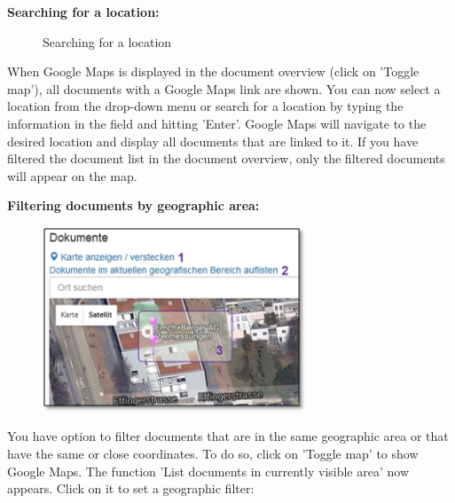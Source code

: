 \textbf{Searching for a location:} 

\begin{figure}[H]
\caption{Searching for a location}
\end{figure}

When Google Maps is displayed in the document overview (click on 'Toggle map'), all documents with a Google Maps link are shown. You can now select a location from the drop-down menu  or search for a location  by typing the information in the field and hitting 'Enter'. Google Maps will navigate to the desired location and display all documents that are linked to it. If you have filtered the document list in the document overview, only the filtered documents will appear on the map. \newline

\textbf{Filtering documents by geographic area:} \\

\begin{figure}
  \vspace{-35pt}
  \begin{center}
    \includegraphics[height=55mm]{../chapters/11_Dokumentenablage/pictures/11-2-3_GeoBereichFilter.jpg}
  \end{center}
  \vspace{-20pt}
  \vspace{-10pt}
\end{figure}
You have option to filter documents that are in the same geographic area or that have the same or close coordinates. To do so, click on 'Toggle map'  to show Google Maps. The function 'List documents in currently visible area'  now appears. Click on it to set a geographic filter:

